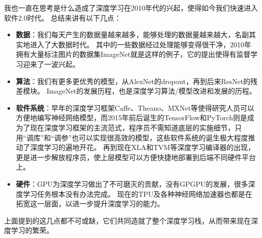 \bigskip
\begin{tcolorbox}
我也一直在思考是什么造成了深度学习在2010年代的兴起，使得如今我们快速进入软件2.0时代\cite{olukotun:software2_2018}。
总结来讲有以下几点：
\begin{itemize}
    \item \textbf{数据}：我们每天产生的数据量越来越多，能够处理的数据量越来越大，名副其实地进入了大数据时代。
    其中的一些数据经过处理能够变得很干净，2010年拥有大量标注图片的数据集ImageNet\cite{deng:imagenet_2009}就是这样的例子，它的提出使得有监督学习迎来了一波兴起。
    \item \textbf{算法}：我们有更多更优秀的模型，从AlexNet的dropout\cite{krizhevsky:alexnet_2012}，再到后来ResNet的残差模块\cite{he:resnet_2016}。
    ImageNet的发展历程，也是深度学习算法/模型改进和发展的历程。
    \item \textbf{软件系统}：早年的深度学习框架Caffe\cite{jia:caffe_2014}、Theano\cite{ai-rfou:theano_2016}、MXNet\cite{chen:mxnet_2016}等使得研究人员可以方便地编写神经网络模型，而2015年前后诞生的TensorFlow\cite{abadi:tensorflow_2016}和PyTorch\cite{paszke:pytorch_2019}则是成为了现在深度学习框架的主流范式，程序员不需知道底层的实施细节，只用“调库”和“调参”也可以实现很高效的模型，这些软件系统的诞生极大程度推动了深度学习的遍地开花。
    再到现在XLA\cite{google:xla}和TVM\cite{chen:tvm_2018}等深度学习编译器的出现，更是进一步解放程序员，使上层模型可以方便快捷地部署到后端不同硬件平台上。
    \item \textbf{硬件}：GPU为深度学习做出了不可磨灭的贡献，没有GPGPU的发展，很多深度学习任务根本没有办法完成。
    现在的TPU\cite{jouppi:tpu_2017}及各种神经网络加速器\cite{moreau:vta_2018}也都是在拓宽这一层面，以进一步提升深度学习的能力。
\end{itemize}
上面提到的这几点都不可或缺，它们共同造就了整个深度学习栈，从而带来现在深度学习的繁荣。
\end{tcolorbox}